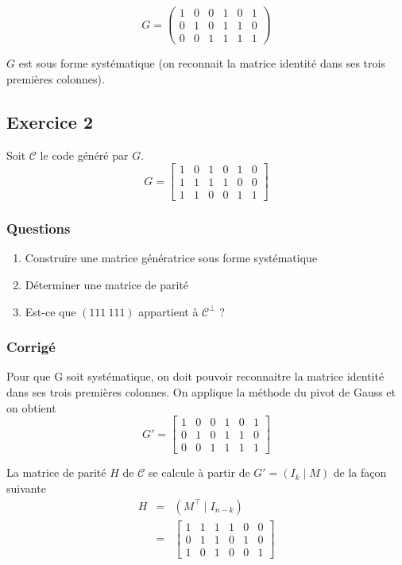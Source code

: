 \documentclass[a4paper,10pt,twocolumn]{article}
\theoremstyle{break}
\newcommand{\code}[1]{\mathcal{#1}}
\newcommand{\C}{\code{C}}
\begin{document}
$$ G = \begin{pmatrix}
 1 & 0 & 0 & 1 & 0 & 1\\
 0 & 1 & 0 & 1 & 1 & 0\\
 0 & 0 & 1 & 1 & 1 & 1
\end{pmatrix} $$

$G$ est sous forme systématique (on reconnait la matrice identité dans ses trois premières colonnes).

\subsection*{Exercice 2}
Soit $\C$ le code généré par $G$.
$$ G = 
\begin{bmatrix}
 1 & 0 & 1 & 0 & 1 & 0 \\
 1 & 1 & 1 & 1 & 0 & 0 \\
 1 & 1 & 0 & 0 & 1 & 1
\end{bmatrix}$$

\subsubsection*{Questions}
\begin{enumerate}
 \item Construire une matrice génératrice sous forme systématique 
 \item Déterminer une matrice de parité
 \item Est-ce que $(111\ 111)$ appartient à $\C^\bot$ ?
\end{enumerate}

\subsubsection*{Corrigé}
Pour que G soit systématique, on doit pouvoir reconnaitre la matrice identité dans ses trois premières colonnes.
On applique la méthode du pivot de Gauss et on obtient
$$G' = 
\begin{bmatrix}
 1 & 0 & 0 & 1 & 0 & 1 \\
 0 & 1 & 0 & 1 & 1 & 0 \\
 0 & 0 & 1 & 1 & 1 & 1
\end{bmatrix}$$

La matrice de parité $H$ de $\C$ se calcule à partir de $G' = (I_k \mid M)$ de la façon suivante
\begin{eqnarray*}
H & = & (M^\top \mid I_{n-k})\\
 & = & \begin{bmatrix}
1 & 1 & 1 & 1 & 0 & 0 \\
0 & 1 & 1 & 0 & 1 & 0 \\
1 & 0 & 1 & 0 & 0 & 1
\end{bmatrix}
\end{eqnarray*}
\end{document}

